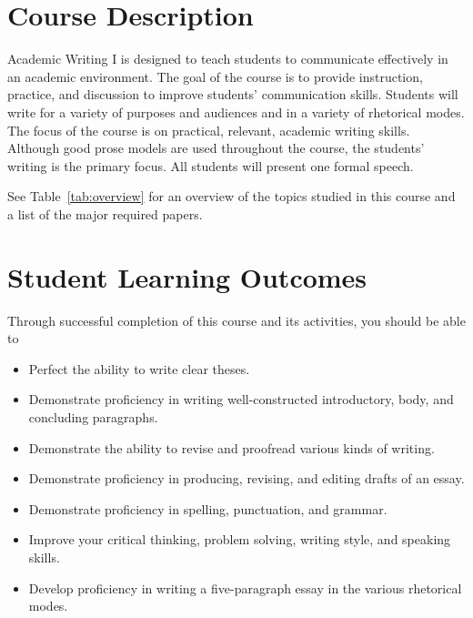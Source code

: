 \documentclass[12pt,oneside]{amsart}	%
\begin{document}
\section{Course Description} %
\label{sub:course_description}
Academic Writing I is designed to teach students to communicate effectively in an academic environment. The goal of the course is to provide instruction, practice, and discussion to improve students' communication skills. Students will write for a variety of purposes and audiences and in a variety of rhetorical modes. The focus of the course is on practical, relevant, academic writing skills. Although good prose models are used throughout the course, the students' writing is the primary focus. All students will present one formal speech. 

See Table~\ref{tab:overview} for an overview of the topics studied in this course and a list of the major required papers.



\section{Student Learning Outcomes}\label{outcomes}
Through successful completion of this course and its activities, you should be able to
\begin{itemize}
	\item Perfect the ability to write clear theses. 
	\item Demonstrate proficiency in writing well-constructed introductory, body, and concluding paragraphs.
	\item Demonstrate the ability to revise and proofread various kinds of writing.
	\item Demonstrate proficiency in producing, revising, and editing drafts of an essay.
	\item Demonstrate proficiency in spelling, punctuation, and grammar.
	\item Improve your critical thinking, problem solving, writing style, and speaking skills.
	\item Develop proficiency in writing a five-paragraph essay in the various rhetorical modes.
\end{itemize}
\end{document}
